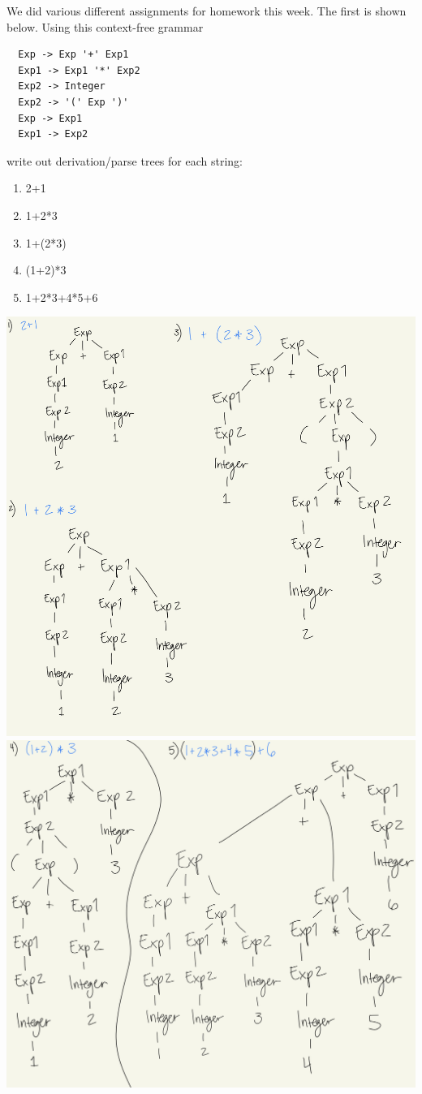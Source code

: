 \documentclass{article}
\theoremstyle{theorem}
\theoremstyle{definition}
\theoremstyle{remark}
\begin{document}
We did various different assignments for homework this week. The first is shown below.
Using this context-free grammar
\begin{lstlisting}
  Exp -> Exp '+' Exp1 
  Exp1 -> Exp1 '*' Exp2              
  Exp2 -> Integer            
  Exp2 -> '(' Exp ')'  
  Exp -> Exp1             
  Exp1 -> Exp2 
\end{lstlisting}
write out derivation/parse trees for each string:
\begin{enumerate}
  \item 2+1
  \item 1+2*3
  \item 1+(2*3)
  \item (1+2)*3
  \item 1+2*3+4*5+6
\end{enumerate}
\includegraphics[scale=0.15]{IMG_1712}
\includegraphics[scale=0.15]{IMG_1713}
\end{document}
